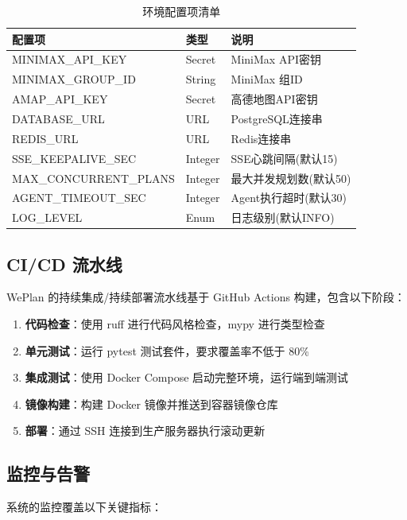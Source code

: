 \documentclass[12pt,a4paper]{ctexart}
\begin{document}
\begin{table}[H]
\centering
\caption{环境配置项清单}
\label{tab:env-config}
\renewcommand{\arraystretch}{1.3}
{\small
\begin{tabular}{p{4.5cm} p{3cm} p{4.5cm}}
\toprule
\textbf{配置项} & \textbf{类型} & \textbf{说明} \\
\midrule
MINIMAX\_API\_KEY & Secret & MiniMax API密钥 \\
MINIMAX\_GROUP\_ID & String & MiniMax 组ID \\
AMAP\_API\_KEY & Secret & 高德地图API密钥 \\
DATABASE\_URL & URL & PostgreSQL连接串 \\
REDIS\_URL & URL & Redis连接串 \\
SSE\_KEEPALIVE\_SEC & Integer & SSE心跳间隔(默认15) \\
MAX\_CONCURRENT\_PLANS & Integer & 最大并发规划数(默认50) \\
AGENT\_TIMEOUT\_SEC & Integer & Agent执行超时(默认30) \\
LOG\_LEVEL & Enum & 日志级别(默认INFO) \\
\bottomrule
\end{tabular}
}
\end{table}

\subsection{CI/CD 流水线}

WePlan 的持续集成/持续部署流水线基于 GitHub Actions 构建，包含以下阶段：

\begin{enumerate}[leftmargin=2em]
  \item \textbf{代码检查}：使用 ruff 进行代码风格检查，mypy 进行类型检查
  \item \textbf{单元测试}：运行 pytest 测试套件，要求覆盖率不低于 80\%
  \item \textbf{集成测试}：使用 Docker Compose 启动完整环境，运行端到端测试
  \item \textbf{镜像构建}：构建 Docker 镜像并推送到容器镜像仓库
  \item \textbf{部署}：通过 SSH 连接到生产服务器执行滚动更新
\end{enumerate}

\subsection{监控与告警}

系统的监控覆盖以下关键指标：
\end{document}
